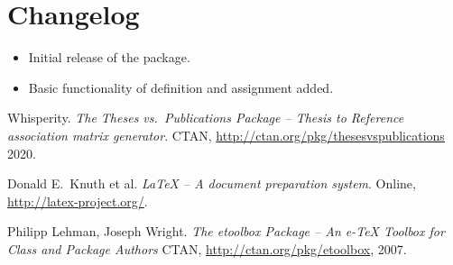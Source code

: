 \documentclass{article}
\begin{document}
\section{Changelog}\label{changelog}
\begin{itemize}
    \item Initial release of the package.
    \item Basic functionality of definition and assignment added.
\end{itemize}


\begin{thebibliography}{3}
Whisperity. \textit{The \textsf{Theses vs.\ Publications} Package -- Thesis to Reference association matrix generator}.
CTAN, \url{http://ctan.org/pkg/thesesvspublications} 2020.

Donald E.\ Knuth et al. 
\textit{\LaTeX{} -- A document preparation system}. 
Online, \url{http://latex-project.org/}.

Philipp Lehman, Joseph Wright.
\textit{The \textsf{etoolbox} Package -- An e-\TeX{} Toolbox for Class and Package Authors}
CTAN, \url{http://ctan.org/pkg/etoolbox}, 2007.
\end{thebibliography}
\end{document}

